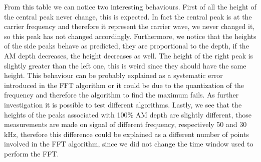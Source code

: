 \documentclass[a4paper,10pt]{article}
\begin{document}
From this table we can notice two interesting behaviours. First of all the height of the central peak never change, this is expected. In fact the central peak is at the carrier frequency and therefore it represent the carrier wave, we never changed it, so this peak has not changed accordingly. Furthermore, we notice that the heights of the side peaks behave as predicted, they are proportional to the depth, if the AM depth decreases, the height decreases as well. The height of the right peak is slightly greater than the left one, this is weird since they should have the same height. This behaviour can be probably explained as a systematic error introduced in the FFT algorithm or it could be due to the quantization of the frequency and therefore the algorithm to find the maximum fails. As further investigation it is possible to test different algorithms. Lastly, we see that the heights of the peaks associated with 100\% AM depth are slightly different, those measurements are made on signal of different frequency, respectively 50 and 30 kHz, therefore this difference could be explained as a different number of points involved in the FFT algorithm, since we did not change the time window used to perform the FFT.
\end{document}
